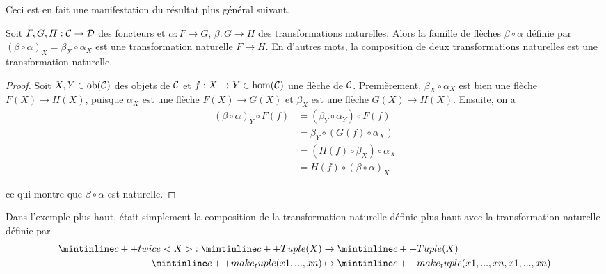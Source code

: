 Ceci est en fait une manifestation du résultat plus général suivant.
\begin{théorème}
    Soit $F,G,H : \mathcal{C} \to \mathcal{D}$ des foncteurs et $\alpha : F \to G$, $\beta : G \to H$
    des transformations naturelles. Alors la famille de flèches $\beta \circ \alpha$
    définie par $(\beta \circ \alpha)_X = \beta_X \circ \alpha_X$ est une
    transformation naturelle $F \to H$. En d'autres mots, la composition de
    deux transformations naturelles est une transformation naturelle.
\end{théorème}
\begin{proof}
    Soit $X, Y \in \mathrm{ob}(\mathcal{C})$ des objets de $\mathcal{C}$ et $f : X \to Y \in \hom(\mathcal{C})$
    une flèche de $\mathcal{C}$. Premièrement, $\beta_X \circ \alpha_X$ est bien une
    flèche $F(X) \to H(X)$, puisque $\alpha_X$ est une flèche $F(X) \to G(X)$
    et $\beta_X$ est une flèche $G(X) \to H(X)$. Ensuite, on a
    \begin{align*}
        (\beta \circ \alpha)_Y \circ F(f)
            &= (\beta_Y \circ \alpha_Y) \circ F(f)                          \\
            &= \beta_Y \circ (G(f) \circ \alpha_X)                          \\
            &= (H(f) \circ \beta_X) \circ \alpha_X                          \\
            &= H(f) \circ (\beta \circ \alpha)_X
    \end{align*}

    ce qui montre que $\beta \circ \alpha$ est naturelle.
\end{proof}

Dans l'exemple plus haut,  était simplement la composition
de la transformation naturelle  définie plus haut avec la
transformation naturelle  définie par
\begin{align*}
    \icpp{twice<X>} : \icpp{Tuple(X)} &\to \icpp{Tuple(X)} \\
                      \icpp{make_tuple(x1, ..., xn)} &\mapsto \icpp{make_tuple(x1, ..., xn, x1, ..., xn)}
\end{align*}
